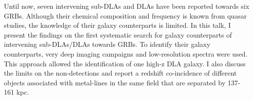 


\bigskip



\bigskip

\noindent Until now, seven intervening sub-DLAs and DLAs have been reported towards six GRBs. Although their chemical composition and frequency is known from quasar studies, the knowledge of their galaxy counterparts is limited. In this talk, I present the findings on the first systematic search for galaxy counterparts of intervening sub-DLAs/DLAs towards GRBs. To identify their galaxy counterparts, very deep imaging campaigns and low-resolution spectra were used. This approach allowed the identification of one high-z DLA galaxy. I also discuss the limits on the non-detections and report a redshift co-incidence of different objects associated with metal-lines in the same field that are separated by 137-161 kpc.

